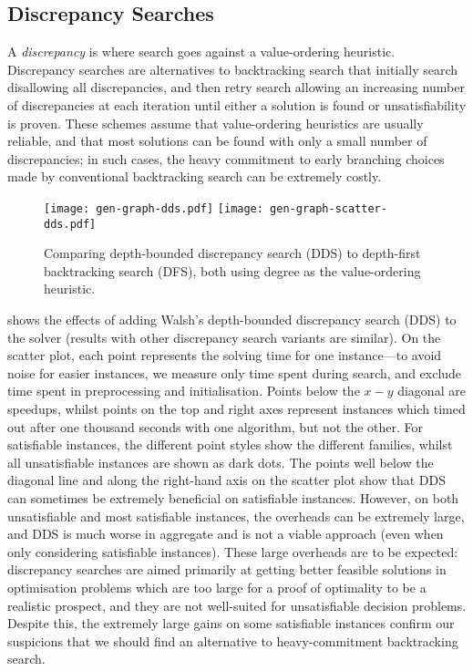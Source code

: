 \documentclass[runningheads]{llncs}
\begin{document}
\subsection{Discrepancy Searches}

A \emph{discrepancy} is where search goes against a value-ordering heuristic.  Discrepancy searches
\cite{DBLP:conf/ijcai/HarveyG95,DBLP:conf/aaai/Korf96,DBLP:conf/ijcai/Walsh97,DBLP:conf/cpaior/KarouiHLN07}
are alternatives to backtracking search that initially search disallowing all discrepancies, and
then retry search allowing an increasing number of discrepancies at each iteration until either a
solution is found or unsatisfiability is proven. These schemes assume that value-ordering heuristics
are usually reliable, and that most solutions can be found with only a small number of
discrepancies; in such cases, the heavy commitment to early branching choices made by conventional
backtracking search can be extremely costly.

\begin{figure}[tb]
    \texttt{[image: gen-graph-dds.pdf]}
    \hfill
    \texttt{[image: gen-graph-scatter-dds.pdf]}

    \caption{Comparing depth-bounded discrepancy search (DDS) to depth-first backtracking search
    (DFS), both using degree as the value-ordering heuristic.}\label{figure:scatter-dds}
\end{figure}

 shows the effects of adding Walsh's \cite{DBLP:conf/ijcai/Walsh97}
depth-bounded discrepancy search (DDS) to the solver (results with other discrepancy search variants
are similar). On the scatter plot, each point represents the solving time for one instance---to
avoid noise for easier instances, we measure only time spent during search, and exclude time spent
in preprocessing and initialisation.  Points below the $x-y$ diagonal are speedups, whilst points on
the top and right axes represent instances which timed out after one thousand seconds with one
algorithm, but not the other. For satisfiable instances, the different point styles show the
different families, whilst all unsatisfiable instances are shown as dark dots.  The points well
below the diagonal line and along the right-hand axis on the scatter plot show that DDS can
sometimes be extremely beneficial on satisfiable instances.  However, on both unsatisfiable and most
satisfiable instances, the overheads can be extremely large, and DDS is much worse in aggregate and
is not a viable approach (even when only considering satisfiable instances).  These large overheads
are to be expected: discrepancy searches are aimed primarily at getting better feasible solutions in
optimisation problems which are too large for a proof of optimality to be a realistic prospect, and
they are not well-suited for unsatisfiable decision problems. Despite this, the extremely large
gains on some satisfiable instances confirm our suspicions that we should find an alternative to
heavy-commitment backtracking search.
\end{document}
